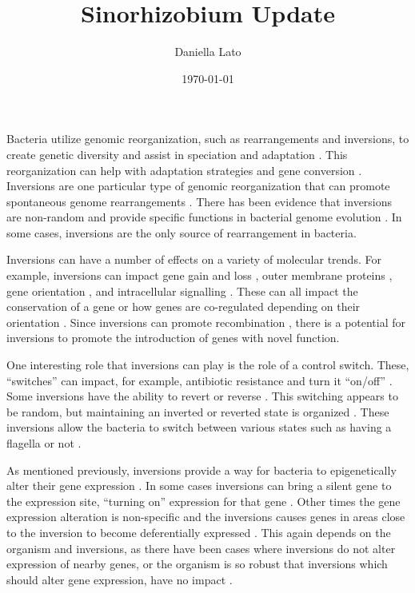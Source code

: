 \documentclass[12pt]{article}
\title{Sinorhizobium Update}
\author{Daniella Lato}
\date{\today}
\begin{document}
Bacteria utilize genomic reorganization, such as rearrangements and inversions, to create genetic diversity  \citep{hughes2000functional,belda2005genome} and assist in speciation and adaptation \citep{kresse2003}.
This reorganization can help with adaptation strategies \citep{rocha2004order, hanage2016not} and gene conversion \citep{hanage2016not}.
Inversions are one particular type of genomic reorganization that can promote spontaneous genome rearrangements \citep{sun2012}.
There has been evidence that inversions are non-random and provide specific functions in bacterial genome evolution \citep{kresse2003}.
In some cases, inversions are the only source of rearrangement in bacteria. %


Inversions can have a number of effects on a variety of molecular trends.
For example, inversions can impact gene gain and loss \citep{furuta2011}, outer membrane proteins \citep{furuta2011}, gene orientation%
, and intracellular signalling \citep{sekulovic2018}.
These can all impact the conservation of a gene or how genes are co-regulated depending on their orientation \citep{Huyn:01}.
Since inversions can promote recombination \citep{segall1988}, there is a potential for inversions to promote the introduction of genes with novel function. %

One interesting role that inversions can play is the role of a control switch.
These, ``switches'' can impact, for example, antibiotic resistance and turn it ``on/off'' \citep{cui2012}.
Some inversions have the ability to revert or reverse \citep{hill1988,louarn1985,cui2012}. %
This switching appears to be random, but maintaining an inverted or reverted state is organized \citep{cui2012,sekulovic2018}.
These inversions allow the bacteria to switch between various states \citep{borst1987programmed} such as having a flagella or not \citep{LiJ:19}.

As mentioned previously, inversions provide a way for bacteria to epigenetically alter their gene expression \citep{zieg1978,sekulovic2018,LiJ:19}.%
In some cases inversions can bring a silent gene to the expression site, ``turning on'' expression for that gene \citep{cerdeno2005}.
Other times the gene expression alteration is non-specific and the inversions causes genes in areas close to the inversion to become deferentially expressed \citep{cerdeno2005,naseeb2016,sekulovic2018}. %
This again depends on the organism and inversions, as there have been cases where inversions do not alter expression of nearby genes, %
or the organism is so robust that inversions which should alter gene expression, have no impact \citep{alokam2002inversions}.
\end{document}
